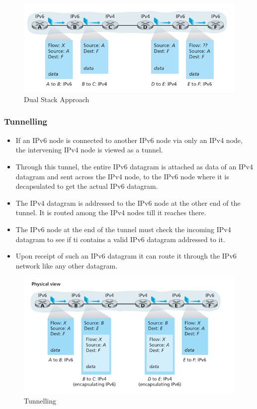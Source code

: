 \documentclass[a4paper]{article}
\theoremstyle{plain}
\theoremstyle{definition}
\begin{document}
\begin{figure}[!h]
    \centering
    \includegraphics[scale=0.7]{cn13.png}
    \caption{Dual Stack Approach}
    \label{fig:my_label_13}
\end{figure}

\subsubsection{Tunnelling}
\begin{itemize}
    \item If an IPv6 node is connected to another IPv6 node via only an IPv4 node, the intervening IPv4 node is viewed as a tunnel.
    
    \item Through this tunnel, the entire IPv6 datagram is attached as data of an IPv4 datagram and sent across the IPv4 node, to the IPv6 node where it is decapsulated to get the actual IPv6 datagram. 
    
    \item The IPv4 datagram is addressed to the IPv6 node at the other end of the tunnel. It is routed among the IPv4 nodes till it reaches there. 
    
    \item The IPv6 node at the end of the tunnel must check the incoming IPv4 datagram to see if ti contains a valid IPv6 datagram addressed to it. 
    
    \item Upon receipt of such an IPv6 datagram it can route it through the IPv6 network like any other datagram.  
\end{itemize}

\begin{figure}[!ht]
    \centering
    \includegraphics[scale=0.7]{cn14.png}
    \caption{Tunnelling}
    \label{fig:my_label_14}
\end{figure}
\end{document}
